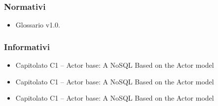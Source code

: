 \subsubsection{Normativi}
\begin{itemize}
\item Glossario v1.0.
\end{itemize}

\subsubsection{Informativi}
\begin{itemize}
\item Capitolato C1 – Actor base: A NoSQL Based on the Actor model\\
\item Capitolato C1 – Actor base: A NoSQL Based on the Actor model\\
\item Capitolato C1 – Actor base: A NoSQL Based on the Actor model\\

\end{itemize}
\newpage

